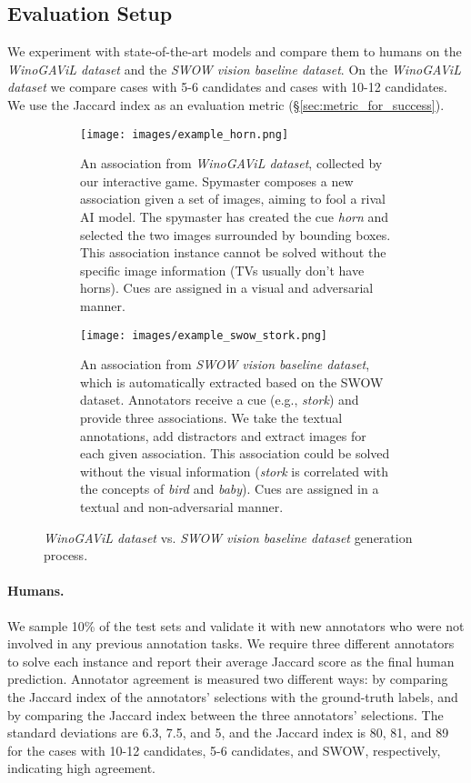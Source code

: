 \documentclass{article}
\newcommand{\ouracronym}[0]{WinoGAViL}
\newcommand{\swowsplit}[0]{\emph{\textit{SWOW} vision baseline dataset}}
\newcommand{\gamesplit}[0]{\emph{\textit{\ouracronym{}} dataset}}
\begin{document}
\subsection{Evaluation Setup}
We experiment with state-of-the-art models and compare them to humans on the \gamesplit{} and the \swowsplit{}. On the \gamesplit{} we compare cases with 5-6 candidates and cases with 10-12 candidates. We use the Jaccard index as an evaluation metric (\S\ref{sec:metric_for_success}).
\begin{figure}[!t]
\centering
\begin{subfigure}{.48\textwidth}
  \centering
  \texttt{[image: images/example\_horn.png]}
  \caption{An association from \gamesplit{}, collected by our interactive game. Spymaster composes a new association given a set of images, aiming to fool a rival AI model. The spymaster has created the cue \emph{horn} and selected the two images surrounded by bounding boxes. This association instance cannot be solved without the specific image information (TVs usually don't have horns). Cues are assigned in a visual and adversarial manner.}
\end{subfigure}\hspace{2mm}
\begin{subfigure}{.48\textwidth}
  \centering
  \texttt{[image: images/example\_swow\_stork.png]}
  \caption{An association from \swowsplit{}, which is automatically extracted based on the SWOW dataset. Annotators receive a cue (e.g., \emph{stork}) and provide three associations. We take the textual annotations, add distractors and extract images for each given association. This association could be solved without the visual information (\emph{stork} is correlated with the concepts of \emph{bird} and \emph{baby}). Cues are assigned in a textual and non-adversarial manner.}
\end{subfigure}
\caption{\gamesplit{} vs. \swowsplit{} generation process.}
\label{fig:swow_vs_winogavil}
\end{figure}
 \paragraph{Humans.} 
\label{sec:human_eval} We sample 10\% of the test sets and validate it with new annotators who were not involved in any previous annotation tasks. We require three different annotators to solve each instance and report their average Jaccard score as the final human prediction. Annotator agreement is measured two different ways: by comparing the Jaccard index of the annotators' selections with the ground-truth labels, and by comparing the Jaccard index between the three annotators' selections. The standard deviations are 6.3, 7.5, and 5, and the Jaccard index is 80, 81, and 89 for the cases with 10-12 candidates, 5-6 candidates, and SWOW, respectively, indicating high agreement. 
\end{document}
